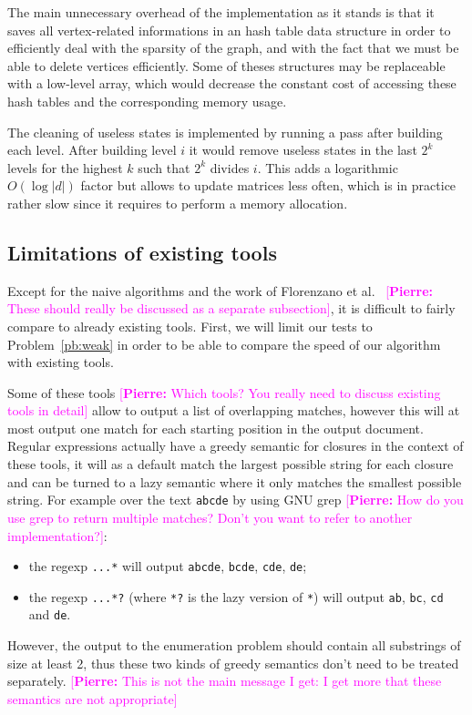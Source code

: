 \documentclass[12px]{article}
\theoremstyle{definition}
\newcommand{\pierre}[1]{\textcolor{magenta}{[\textbf{Pierre:} #1]}}
\begin{document}
      The main unnecessary overhead of the implementation as it stands is that
      it saves all vertex-related informations in an hash table data structure
      in order to efficiently deal with the sparsity of the graph, and with the
      fact that we must be able to delete vertices efficiently. Some of theses
      structures may be replaceable with a low-level array, which would
      decrease the constant cost of accessing these hash tables and the
      corresponding memory usage.

      The cleaning of useless states is implemented by running a pass after
      building each level. After building level $i$ it would remove useless
      states in the last $2^k$ levels for the highest $k$ such that $2^k$
      divides $i$. This adds a logarithmic $O(\log |d|)$ factor but allows to
      update  matrices less often, which is in practice rather
      slow since it requires to perform a memory allocation.

    \subsection{Limitations of existing tools}

      Except for the naive algorithms and the work of Florenzano et
      al.~\cite{florenzano2018constant} \pierre{These should really be
      discussed as a separate subsection}, it is difficult to fairly compare to
      already existing tools. First, we will limit our tests to
      Problem~\ref{pb:weak} in order to be able to compare the speed of our
      algorithm with existing tools.

      Some of these tools \pierre{Which tools? You really need to discuss
      existing tools in detail} allow to output a list of overlapping matches,
      however this will at most output one match for each starting position in
      the output document. Regular expressions actually have a greedy semantic
      for closures in the context of these tools, it will as a default match
      the largest possible string for each closure and can be turned to a lazy
      semantic where it only matches the smallest possible string. For example
      over the text \texttt{abcde} by using GNU grep \pierre{How do you use
      grep to return multiple matches? Don't you want to refer to another
      implementation?}:
        \begin{itemize}
          \item the regexp \texttt{...*} will output \texttt{abcde},
            \texttt{bcde}, \texttt{cde}, \texttt{de};
          \item the regexp \texttt{...*?} (where \texttt{*?} is the lazy
            version of \texttt{*}) will output \texttt{ab}, \texttt{bc},
            \texttt{cd} and \texttt{de}.
        \end{itemize}
      However, the output to the enumeration problem should contain all
      substrings of size at least 2, thus these two kinds of greedy semantics
      don't need to be treated separately. \pierre{This is not the main
      message I get: I get more that these semantics are not appropriate}
\end{document}

